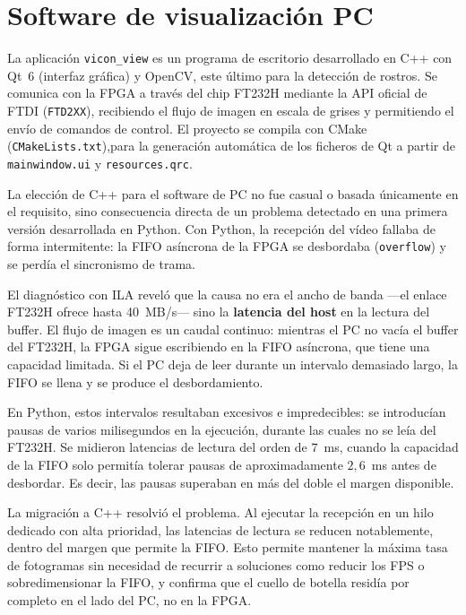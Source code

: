 \documentclass[../main.tex]{subfiles}
\begin{document}
\chapter{Software de visualización PC}
\label{chap:software}

La aplicación \texttt{vicon\_view} es un programa de escritorio desarrollado en C++ con Qt~6 (interfaz gráfica) y OpenCV, este último para la detección de rostros. Se comunica con la FPGA a través del chip FT232H mediante la API oficial de FTDI (\texttt{FTD2XX}), recibiendo el flujo de imagen en escala de grises y permitiendo el envío de comandos de control. El proyecto se compila con CMake (\texttt{CMakeLists.txt}),para la generación automática de los ficheros de Qt a partir de \texttt{mainwindow.ui} y \texttt{resources.qrc}.

La elección de C++ para el software de PC no fue casual o basada únicamente en el requisito, sino consecuencia directa de un problema detectado en una primera versión desarrollada en Python. Con Python, la recepción del vídeo fallaba de forma intermitente: la \ac{FIFO} asíncrona de la \ac{FPGA} se desbordaba (\texttt{overflow}) y se perdía el sincronismo de trama.

El diagnóstico con ILA reveló que la causa no era el ancho de banda —el enlace FT232H ofrece hasta 40~MB/s— sino la \textbf{latencia del host} en la lectura del buffer. El flujo de imagen es un caudal continuo: mientras el PC no vacía el buffer del FT232H, la \ac{FPGA} sigue escribiendo en la \ac{FIFO} asíncrona, que tiene una capacidad limitada. Si el PC deja de leer durante un intervalo demasiado largo, la \ac{FIFO} se llena y se produce el desbordamiento.

En Python, estos intervalos resultaban excesivos e impredecibles: se introducían pausas de varios milisegundos en la ejecución, durante las cuales no se leía del FT232H. Se midieron latencias de lectura del orden de $7$~ms, cuando la capacidad de la \ac{FIFO} solo permitía tolerar pausas de aproximadamente $2{,}6$~ms antes de desbordar. Es decir, las pausas superaban en más del doble el margen disponible.

La migración a C++ resolvió el problema. Al ejecutar la recepción en un hilo dedicado con alta prioridad, las latencias de lectura se reducen notablemente, dentro del margen que permite la \ac{FIFO}. Esto permite mantener la máxima tasa de fotogramas sin necesidad de recurrir a soluciones como reducir los \ac{FPS} o sobredimensionar la \ac{FIFO}, y confirma que el cuello de botella residía por completo en el lado del PC, no en la \ac{FPGA}.
\end{document}
